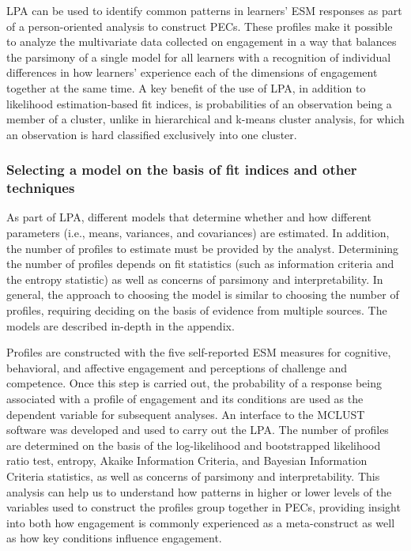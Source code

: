 \documentclass[]{msu-thesis}
\theoremstyle{definition}
\theoremstyle{definition}
\theoremstyle{definition}
\theoremstyle{remark}
\begin{document}
LPA can be used to identify common patterns in learners' ESM responses
as part of a person-oriented analysis to construct PECs. These profiles
make it possible to analyze the multivariate data collected on
engagement in a way that balances the parsimony of a single model for
all learners with a recognition of individual differences in how
learners' experience each of the dimensions of engagement together at
the same time. A key benefit of the use of LPA, in addition to
likelihood estimation-based fit indices, is probabilities of an
observation being a member of a cluster, unlike in hierarchical and
k-means cluster analysis, for which an observation is hard classified
exclusively into one cluster.

\subsubsection{Selecting a model on the basis of fit indices and other
techniques}\label{selecting-a-model-on-the-basis-of-fit-indices-and-other-techniques}

As part of LPA, different models that determine whether and how
different parameters (i.e., means, variances, and covariances) are
estimated. In addition, the number of profiles to estimate must be
provided by the analyst. Determining the number of profiles depends on
fit statistics (such as information criteria and the entropy statistic)
as well as concerns of parsimony and interpretability. In general, the
approach to choosing the model is similar to choosing the number of
profiles, requiring deciding on the basis of evidence from multiple
sources. The models are described in-depth in the appendix.

Profiles are constructed with the five self-reported ESM measures for
cognitive, behavioral, and affective engagement and perceptions of
challenge and competence. Once this step is carried out, the probability
of a response being associated with a profile of engagement and its
conditions are used as the dependent variable for subsequent analyses.
An interface to the MCLUST software was developed and used to carry out
the LPA. The number of profiles are determined on the basis of the
log-likelihood and bootstrapped likelihood ratio test, entropy, Akaike
Information Criteria, and Bayesian Information Criteria statistics, as
well as concerns of parsimony and interpretability. This analysis can
help us to understand how patterns in higher or lower levels of the
variables used to construct the profiles group together in PECs,
providing insight into both how engagement is commonly experienced as a
meta-construct as well as how key conditions influence engagement.
\end{document}
